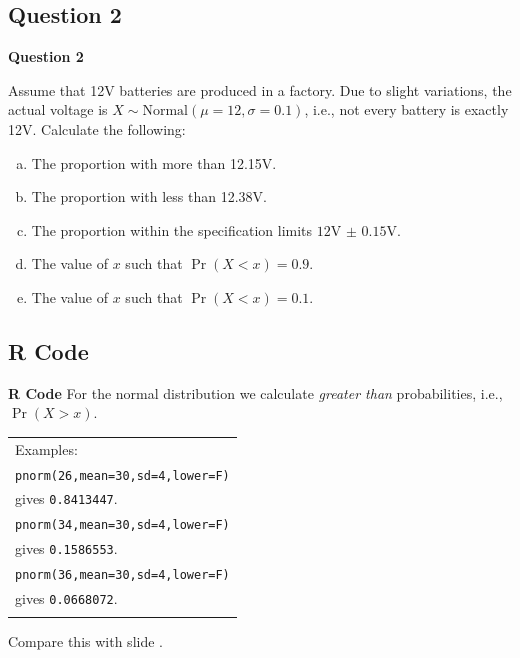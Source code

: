 \documentclass[compress]{beamer}        %
\makeatletter
\newcommand{\tcb}{\textcolor{beamer@blendedblue}}
\makeatother
\begin{document}
\subsection{Question 2}
\begin{frame}{\bf \tcb{Question 2}}

Assume that 12V batteries are produced in a factory. Due to slight variations, the actual voltage is $X \sim \text{Normal}(\mu=12,\sigma=0.1)$, i.e., not every battery is exactly 12V. Calculate the following:\\[0.3cm]

\begin{enumerate}[a)]\itemsep0.3cm
\item The proportion with more than 12.15V.
\item The proportion with less than 12.38V.
\item The proportion within the specification limits $12$V $\pm$ $0.15$V.
\item The value of $x$ such that $\Pr(X < x) = 0.9$.
\item The value of $x$ such that $\Pr(X < x) = 0.1$.
\end{enumerate}

\end{frame}




\subsection{R Code}
\begin{frame}{\bf \tcb{R Code}}
For the normal distribution we calculate \emph{greater than} probabilities, i.e., $\Pr(X > x)$.\\[0.4cm]

\begin{tabular}{|l|}
\hline
Examples: \\[0.2cm]
\texttt{pnorm(26,mean=30,sd=4,lower=F)} \\
gives \texttt{0.8413447}.\\[0.2cm]
\texttt{pnorm(34,mean=30,sd=4,lower=F)} \\
gives \texttt{0.1586553}.\\[0.2cm]
\texttt{pnorm(36,mean=30,sd=4,lower=F)} \\
gives \texttt{0.0668072}.\\[0.2cm]
\hline
\multicolumn{1}{c}{}\\[0.0cm]
\end{tabular}

Compare this with slide \pageref{normexampletab}.\\[0.6cm]

\end{frame}
\end{document}
